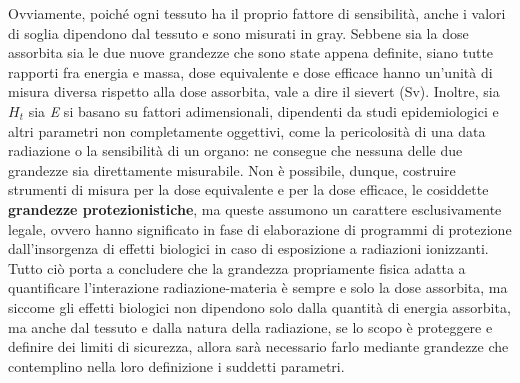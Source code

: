 \documentclass{report}
\numberwithin{equation}{section}
\numberwithin{figure}{section}
\begin{document}
Ovviamente, poiché ogni tessuto ha il proprio fattore di sensibilità, anche i valori di soglia dipendono dal tessuto e sono misurati in gray. Sebbene sia la dose assorbita sia le due nuove grandezze che sono state appena definite, siano tutte rapporti fra energia e massa, dose equivalente e dose efficace hanno un'unità di misura diversa rispetto alla dose assorbita, vale a dire il sievert (Sv). Inoltre, sia $H_t$ sia \textit{E} si basano su fattori adimensionali, dipendenti da studi epidemiologici e altri parametri non completamente oggettivi, come la pericolosità di una data radiazione o la sensibilità di un organo: ne consegue che nessuna delle due grandezze sia direttamente misurabile. Non è possibile, dunque, costruire strumenti di misura per la dose equivalente e per la dose efficace, le cosiddette \textbf{grandezze protezionistiche}, ma queste assumono un carattere esclusivamente legale, ovvero hanno significato in fase di elaborazione di programmi di protezione dall'insorgenza di effetti biologici in caso di esposizione a radiazioni ionizzanti. Tutto ciò porta a concludere che la grandezza propriamente fisica adatta a quantificare l'interazione radiazione-materia è sempre e solo la dose assorbita, ma siccome gli effetti biologici non dipendono solo dalla quantità di energia assorbita, ma anche dal tessuto e dalla natura della radiazione, se lo scopo è proteggere e definire dei limiti di sicurezza, allora sarà necessario farlo mediante grandezze che contemplino nella loro definizione i suddetti parametri.
\end{document}
